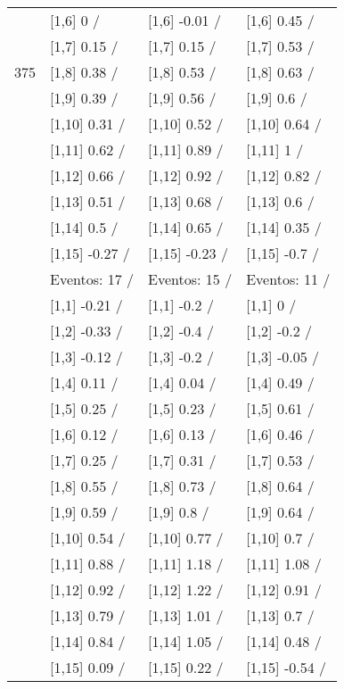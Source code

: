 \begin{table}
\begin{tabular}[t]{llll}
 & {}[1,6] 0  / & {}[1,6] -0.01  / & {}[1,6] 0.45  /\\
 & {}[1,7] 0.15  / & {}[1,7] 0.15  / & {}[1,7] 0.53  /\\
375 & {}[1,8] 0.38  / & {}[1,8] 0.53  / & {}[1,8] 0.63  /\\
\addlinespace
 & {}[1,9] 0.39  / & {}[1,9] 0.56  / & {}[1,9] 0.6  /\\
 & {}[1,10] 0.31  / & {}[1,10] 0.52  / & {}[1,10] 0.64  /\\
 & {}[1,11] 0.62  / & {}[1,11] 0.89  / & {}[1,11] 1  /\\
 & {}[1,12] 0.66  / & {}[1,12] 0.92  / & {}[1,12] 0.82  /\\
 & {}[1,13] 0.51  / & {}[1,13] 0.68  / & {}[1,13] 0.6  /\\
\addlinespace
 & {}[1,14] 0.5  / & {}[1,14] 0.65  / & {}[1,14] 0.35  /\\
 & {}[1,15] -0.27  / & {}[1,15] -0.23  / & {}[1,15] -0.7  /\\
 & Eventos:  17 / & Eventos:  15 / & Eventos:  11 /\\
 & {}[1,1] -0.21  / & {}[1,1] -0.2  / & {}[1,1] 0  /\\
 & {}[1,2] -0.33  / & {}[1,2] -0.4  / & {}[1,2] -0.2  /\\
\addlinespace
 & {}[1,3] -0.12  / & {}[1,3] -0.2  / & {}[1,3] -0.05  /\\
 & {}[1,4] 0.11  / & {}[1,4] 0.04  / & {}[1,4] 0.49  /\\
 & {}[1,5] 0.25  / & {}[1,5] 0.23  / & {}[1,5] 0.61  /\\
 & {}[1,6] 0.12  / & {}[1,6] 0.13  / & {}[1,6] 0.46  /\\
 & {}[1,7] 0.25  / & {}[1,7] 0.31  / & {}[1,7] 0.53  /\\
\addlinespace
500 & {}[1,8] 0.55  / & {}[1,8] 0.73  / & {}[1,8] 0.64  /\\
 & {}[1,9] 0.59  / & {}[1,9] 0.8  / & {}[1,9] 0.64  /\\
 & {}[1,10] 0.54  / & {}[1,10] 0.77  / & {}[1,10] 0.7  /\\
 & {}[1,11] 0.88  / & {}[1,11] 1.18  / & {}[1,11] 1.08  /\\
 & {}[1,12] 0.92  / & {}[1,12] 1.22  / & {}[1,12] 0.91  /\\
\addlinespace
 & {}[1,13] 0.79  / & {}[1,13] 1.01  / & {}[1,13] 0.7  /\\
 & {}[1,14] 0.84  / & {}[1,14] 1.05  / & {}[1,14] 0.48  /\\
 & {}[1,15] 0.09  / & {}[1,15] 0.22  / & {}[1,15] -0.54  /\\
\bottomrule
\end{tabular}
\end{table}
